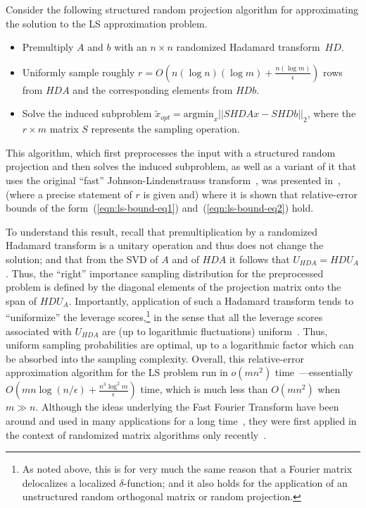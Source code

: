 \documentclass[twoside]{article}
\begin{document}
Consider the following structured random projection algorithm for 
approximating the solution to the LS approximation problem.
\begin{itemize}
\item
Premultiply $A$ and $b$ with an $n \times n$ randomized Hadamard 
transform~$HD$.
\item
Uniformly sample roughly 
$r=O\left(n(\log n)(\log m)+\frac{n (\log m)}{\epsilon}\right)$ rows from 
$HDA$ and the corresponding elements from $HDb$.
\item
Solve the induced subproblem
$ \tilde{x}_{opt} = \mbox{argmin}_x || SHD Ax - SHD b||_2  $, where the 
$r \times m$ matrix $S$ represents the sampling operation.
\end{itemize}
This algorithm, which first preprocesses the input with a structured random 
projection and then solves the induced subproblem, as well as a variant 
of it that uses the original ``fast'' 
Johnson-Lindenstrauss transform~\cite{AC06,AC06-JRNL09,Matousek08_RSA}, was 
presented in~\cite{Sarlos06,DMMS07_FastL2_NM10}, (where a precise 
statement of $r$ is given and) where it is shown that 
relative-error bounds of the form~(\ref{eqn:ls-bound-eq1}) 
and~(\ref{eqn:ls-bound-eq2}) hold.

To understand this result, recall that premultiplication by a randomized 
Hadamard transform is a unitary operation and thus does not change the 
solution; and that from the SVD of $A$ and of $HDA$ it follows that 
$U_{HDA}=HDU_A$.
Thus, the ``right'' importance sampling distribution for the preprocessed 
problem is defined by the diagonal elements of the projection matrix onto 
the span of $HDU_A$.
Importantly, application of such a Hadamard transform tends to 
``uniformize'' the leverage scores,\footnote{As noted above, this is for very much the same reason that a 
Fourier matrix delocalizes a localized $\delta$-function; and it also holds 
for the application of an unstructured random orthogonal matrix or random 
projection.}
in the sense that all the leverage scores associated with $U_{HDA}$ are (up 
to logarithmic fluctuations) uniform~\cite{AC06,DMMS07_FastL2_NM10}.
Thus, uniform sampling probabilities are optimal, up to a logarithmic factor 
which can be absorbed into the sampling complexity.
Overall, this relative-error approximation algorithm for the LS problem 
run in $o(mn^2)$ time~\cite{Sarlos06,DMMS07_FastL2_NM10}---essentially 
$O\left( mn \log(n/\epsilon) + \frac{n^3 \log^2 m}{\epsilon} \right)$ time, 
which is much less than $O(mn^2)$ when $m \gg n$.
Although the ideas underlying the Fast Fourier Transform have been around 
and used in many applications for a long time~\cite{CT65,GR87}, they were 
first applied in the context of randomized matrix algorithms only 
recently~\cite{AC06,Sarlos06,DMMS07_FastL2_NM10}.
\end{document}
